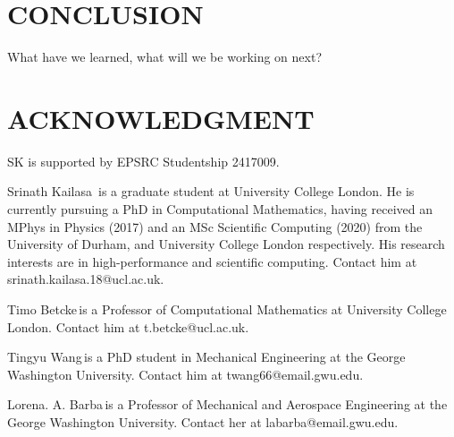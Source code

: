 \documentclass{IEEEcsmag}
\begin{document}


\section{CONCLUSION}

What have we learned, what will we be working on next?

\section{ACKNOWLEDGMENT}

SK is supported by EPSRC Studentship 2417009.




\begin{IEEEbiography}{Srinath Kailasa}{\,} is a graduate student at University College London. He is currently pursuing a PhD in Computational Mathematics, having received an MPhys in Physics (2017) and an MSc Scientific Computing (2020) from the University of Durham, and University College London respectively. His research interests are in high-performance and scientific computing. Contact him at srinath.kailasa.18@ucl.ac.uk.
\end{IEEEbiography}

\begin{IEEEbiography}{Timo Betcke}{\,}is a Professor of Computational Mathematics at University College London. Contact him at t.betcke@ucl.ac.uk.
\end{IEEEbiography}

\begin{IEEEbiography}{Tingyu Wang}{\,}is a PhD student in Mechanical Engineering at the George Washington University. Contact him at twang66@email.gwu.edu.
\end{IEEEbiography}

\begin{IEEEbiography}{Lorena. A. Barba}{\,}is a Professor of Mechanical and Aerospace Engineering at the George Washington University.  Contact her at labarba@email.gwu.edu.
\end{IEEEbiography}
\end{document}
